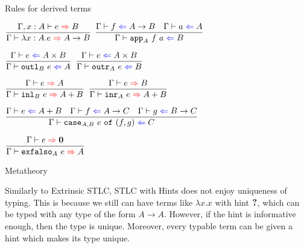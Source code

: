 \documentclass{beamer}
\newcommand{\Fun}[2]{#1 \to #2}
\newcommand{\Prod}[2]{#1 \times #2}
\newcommand{\Sum}[2]{#1 + #2}
\newcommand{\Empty}{\textbf{0}}
\newcommand{\fun}[2]{\lambda #1. #2}
\newcommand{\rulename}[1]{\textsc{\footnotesize{#1}}}
\newcommand{\infrule}[3][]{\displaystyle \frac{#2}{#3} \rulename{#1}}
\newcommand{\extend}[3]{#1, #2 : #3}
\begin{document}
\begin{frame}{Rules for derived terms}

\begin{center}
  $\infrule{\fullinfer{\extend{\Gamma}{x}{A}}{e}{B}}{\infer{\ifun{x}{A}{e}}{\Fun{A}{B}}}$ \quad
  $\infrule{\check{f}{\Fun{A}{B}} \quad \check{a}{A}}{\check{\iapp{A}{f}{a}}{B}}$

  \vspace{2em}

  $\infrule{\check{e}{\Prod{A}{B}}}{\check{\ioutl{B}{e}}{A}}$ \enspace
  $\infrule{\check{e}{\Prod{A}{B}}}{\check{\ioutr{A}{e}}{B}}$

  \vspace{2em}

  $\infrule{\infer{e}{A}}{\infer{\iinl{B}{e}}{\Sum{A}{B}}}$ \quad
  $\infrule{\infer{e}{B}}{\infer{\iinr{A}{e}}{\Sum{A}{B}}}$

  \vspace{2em}

  $\infrule{\check{e}{\Sum{A}{B}} \quad \check{f}{\Fun{A}{C}} \quad \check{g}{\Fun{B}{C}}}{\check{\icase{A}{B}{e}{f}{g}}{C}}$

  \vspace{2em}

  $\infrule{\infer{e}{\Empty}}{\infer{\iexfalso{A}{e}}{A}}$
\end{center}

\end{frame}

\begin{frame}{Metatheory}

Similarly to Extrinsic STLC, STLC with Hints does not enjoy uniqueness of typing. This is because we still can have terms like $\fun{x}{x}$ with hint $\textbf{?}$, which can be typed with any type of the form $\Fun{A}{A}$. However, if the hint is informative enough, then the type is unique. Moreover, every typable term can be given a hint which makes its type unique.

\end{frame}
\end{document}
